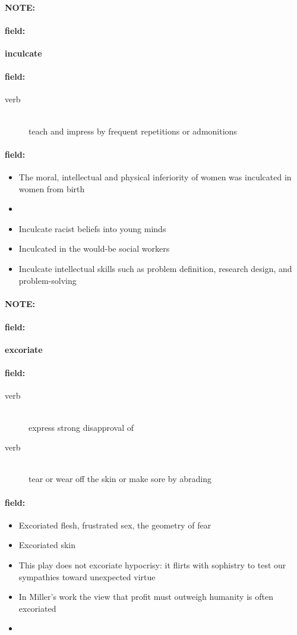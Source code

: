 \documentclass[12pt]{article}
\newenvironment{note}{\paragraph{NOTE:}}{}
\newenvironment{field}{\paragraph{field:}}{}
\begin{document}
\begin{note}
\begin{field}
\textbf{\large inculcate}
\end{field}


\begin{field}
\begin{description}
\item[verb] \hfill \\ 
teach and impress by frequent repetitions or admonitions

\end{description}
\end{field}

\begin{field}
\begin{itemize}
\item The moral, intellectual and physical inferiority of women was inculcated in women from birth
\item 
\item Inculcate racist beliefs into young minds
\item Inculcated in the would-be social workers
\item Inculcate intellectual skills such as problem definition, research design, and problem-solving
\end{itemize}
\end{field}
\end{note}
\begin{note}
\begin{field}
\textbf{\large excoriate}
\end{field}


\begin{field}
\begin{description}
\item[verb] \hfill \\ 
express strong disapproval of

\item[verb] \hfill \\ 
tear or wear off the skin or make sore by abrading

\end{description}
\end{field}

\begin{field}
\begin{itemize}
\item Excoriated flesh, frustrated sex, the geometry of fear
\item Excoriated skin
\item This play does not excoriate hypocrisy: it flirts with sophistry to test our sympathies toward unexpected virtue
\item In Miller's work the view that profit must outweigh humanity is often excoriated
\item 
\end{itemize}
\end{field}
\end{note}
\end{document}
